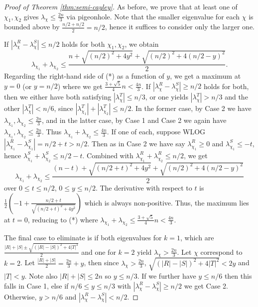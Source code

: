 \documentclass[12pt]{article}
\begin{document}
\begin{proof}[Proof of Theorem \ref{thm:semi-cayley}]
    As before, we prove that at least one of $\chi_1, \chi_2$ gives $\lambda_\chi \le \frac{2n}{3}$ via pigeonhole. Note that the smaller eigenvalue for each $\chi$ is bounded above by $\frac{n/2 + n/2}{2} = n/2$, hence it suffices to consider only the larger one. 
    \begin{outline}
        \1[-] If $|\lambda_\chi^R - \lambda_\chi^S| \le n/2$ holds for both $\chi_1, \chi_2$, we obtain
        \[\lambda_{\chi_1} + \lambda_{\chi_2} \le \frac{n + \sqrt{(n/2)^2 + 4y^2} + \sqrt{(n/2)^2 + 4(n/2-y)^2}}{2}.\tag{*}\]
        Regarding the right-hand side of (*) as a function of $y$, we get a maximum at $y = 0$ (or $y = n/2$) where we get $\frac{3 + \sqrt{5}}{4}n < \frac{4n}{3}$. 
        \1[-] If $|\lambda_\chi^R - \lambda_\chi^S| \ge n/2$ holds for both, then we either have both satisfying $|\lambda_\chi^T| \le n/3$, or one yields $|\lambda_\chi^T| > n/3$ and the other $|\lambda_\chi^T| < n/6$, since $|\lambda_{\chi_1}^T| + |\lambda_{\chi_2}^T| \le n/2$. In the former case, by Case 2 we have $\lambda_{\chi_1}, \lambda_{\chi_2} \le \frac{2n}{3}$, and in the latter case, by Case 1 and Case 2 we again have $\lambda_{\chi_1}, \lambda_{\chi_2} \le \frac{2n}{3}$. Thus $\lambda_{\chi_1} + \lambda_{\chi_2} \le \frac{4n}{3}$.
        \1[-] If one of each, suppose WLOG $|\lambda_{\chi_1}^R - \lambda_{\chi_1}^S| = n/2 + t > n/2$. Then as in Case 2 we have say $\lambda_{\chi_1}^R \ge 0$ and $\lambda_{\chi_1}^S \le -t$, hence $\lambda_{\chi_1}^S + \lambda_{\chi_2}^S \le n/2 - t$. Combined with $\lambda_{\chi_1}^R + \lambda_{\chi_2}^R \le n/2$, we get
        \[\lambda_{\chi_1} + \lambda_{\chi_2} \le \frac{(n-t) + \sqrt{(n/2+t)^2 + 4y^2} + \sqrt{(n/2)^2 + 4(n/2-y)^2}}{2}\]
        over $0 \le t \le n/2$, $0 \le y \le n/2$. The derivative with respect to $t$ is $\frac12 (-1 + \frac{n/2+t}{\sqrt{(n/2+t)^2 + 4y^2}})$ which is always non-positive. Thus, the maximum lies at $t = 0$, reducing to (*) where $\lambda_{\chi_1} + \lambda_{\chi_2} \le \frac{3 + \sqrt{5}}{4} n < \frac{4n}{3}$. 
    \end{outline}

    The final case to eliminate is if both eigenvalues for $k = 1$, which are $\frac{|R| + |S| \pm \sqrt{(|R| - |S|)^2 + 4|T|^2}}{2}$ and one for $k = 2$ yield $\lambda_\chi > \frac{2n}{3}$. Let $\chi$ correspond to $k = 2$. Let $\frac{|R| + |S|}{2} = \frac{2n}{3} + y$, then since $\lambda_\chi > \frac{2n}{3}$, $\sqrt{(|R|-|S|)^2 + 4|T|^2} < 2y$ and $|T| < y$. Note also $|R| + |S| \le 2n$ so $y \le n/3$. If we further have $y \le n/6$ then this falls in Case 1, else if $n/6 \le y \le n/3$ with $|\lambda_\chi^R - \lambda_\chi^S| \ge n/2$ we get Case 2. Otherwise, $y > n/6$ and $|\lambda_\chi^R - \lambda_\chi^S| < n/2$. 


\end{proof}
\end{document}

